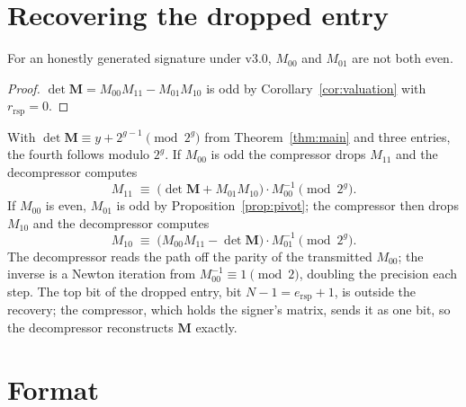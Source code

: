 \documentclass[version=submission]{iacrcc}
\newcommand{\ers}{e_{\mathrm{rsp}}}
\newcommand{\rrs}{r_{\mathrm{rsp}}}
\newcommand{\Mm}{\mathbf{M}}
\begin{document}
\section{Recovering the dropped entry}
\label{sec:recover}

\begin{proposition}
\label{prop:pivot}
For an honestly generated signature under v3.0, $M_{00}$ and $M_{01}$ are
not both even.
\end{proposition}

\begin{proof}
$\det \Mm = M_{00} M_{11} - M_{01} M_{10}$ is odd by
Corollary~\ref{cor:valuation} with $\rrs = 0$.
\end{proof}

With $\det \Mm \equiv y + 2^{g - 1} \pmod{2^g}$ from Theorem~\ref{thm:main}
and three entries, the fourth follows modulo $2^g$. If $M_{00}$ is odd
the compressor drops $M_{11}$ and the decompressor computes
\begin{equation}
\label{eq:m11}
  M_{11} \;\equiv\; \bigl(\det \Mm + M_{01} M_{10}\bigr) \cdot M_{00}^{-1}
  \pmod{2^{g}}.
\end{equation}
If $M_{00}$ is even, $M_{01}$ is odd by Proposition~\ref{prop:pivot};
the compressor then drops $M_{10}$ and the decompressor computes
\begin{equation}
\label{eq:m10}
  M_{10} \;\equiv\; \bigl(M_{00} M_{11} - \det \Mm\bigr) \cdot M_{01}^{-1}
  \pmod{2^{g}}.
\end{equation}
The decompressor reads the path off the parity of the transmitted $M_{00}$; the inverse is a Newton iteration from $M_{00}^{-1} \equiv 1 \pmod 2$, doubling the precision each step.
The top bit of the dropped entry, bit $N - 1 = \ers + 1$, is outside the recovery; the compressor, which holds the signer's matrix, sends it as one bit, so the decompressor reconstructs $\Mm$ exactly.

\section{Format}
\label{sec:format}
\end{document}
